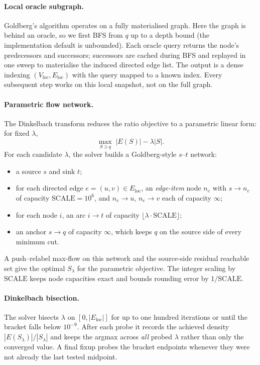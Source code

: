 \documentclass[11pt]{article}
\begin{document}
\paragraph{Local oracle subgraph.}
Goldberg's algorithm operates on a fully materialised graph. Here the graph is
behind an oracle, so we first BFS from $q$ up to a depth bound (the
implementation default is unbounded). Each oracle query returns the node's
predecessors and successors; successors are cached during BFS and replayed in
one sweep to materialise the induced directed edge list. The output is a dense
indexing $(V_{\mathrm{loc}}, E_{\mathrm{loc}})$ with the query mapped to a known
index. Every subsequent step works on this local snapshot, not on the full
graph.

\paragraph{Parametric flow network.}
The Dinkelbach transform reduces the ratio objective to a parametric linear
form: for fixed $\lambda$,
$$
  \max_{S \ni q}\; |E(S)| - \lambda |S|.
$$
For each candidate $\lambda$, the solver builds a Goldberg-style $s$--$t$
network:
\begin{itemize}[leftmargin=1.1cm]
  \item a source $s$ and sink $t$;
  \item for each directed edge $e = (u,v) \in E_{\mathrm{loc}}$, an
  \emph{edge-item} node $n_e$ with $s \to n_e$ of capacity
  $\mathrm{SCALE} = 10^{6}$, and $n_e \to u$, $n_e \to v$ each of capacity
  $\infty$;
  \item for each node $i$, an arc $i \to t$ of capacity
  $\lfloor \lambda \cdot \mathrm{SCALE} \rfloor$;
  \item an anchor $s \to q$ of capacity $\infty$, which keeps $q$ on the source
  side of every minimum cut.
\end{itemize}
A push--relabel max-flow on this network and the source-side residual reachable
set give the optimal $S_\lambda$ for the parametric objective. The integer
scaling by $\mathrm{SCALE}$ keeps node capacities exact and bounds rounding
error by $1/\mathrm{SCALE}$.

\paragraph{Dinkelbach bisection.}
The solver bisects $\lambda$ on $[0, |E_{\mathrm{loc}}|]$ for up to one hundred
iterations or until the bracket falls below $10^{-9}$. After each probe it
records the achieved density $|E(S_\lambda)| / |S_\lambda|$ and keeps the
argmax across \emph{all} probed $\lambda$ rather than only the converged value.
A final fixup probes the bracket endpoints whenever they were not already the
last tested midpoint.
\end{document}
